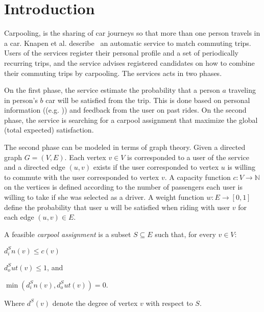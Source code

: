 \section{Introduction}
Carpooling, is the sharing of car journeys so that more than one person travels
in a car.
Knapen et al. describe~\cite{knapen2013estimating} an automatic service
to match commuting trips.
Users of the services register their personal profile and a set of periodically
recurring trips, 
and the service advises registered candidates on how to combine their commuting
trips by carpooling.
The services acts in two phases. 

On the first phase, the service estimate the probability that a person $a$
traveling in person's $b$ car will be satisfied from the trip.
This is done based on personal information ((e.g. )) and feedback from the user on past rides.
On the second phase, the service is searching for a carpool assignment that
maximize the global (total expected) satisfaction.

The second phase can be modeled in terms of graph theory.
Given a directed graph $G = (V, E)$.
Each vertex $v \in V$ is corresponded to a user of the service and a directed
edge $(u, v)$ exists if the user corresponded to vertex $u$ is willing to
commute with the user corresponded to vertex $v$.
A capacity function $ c : V \rightarrow \mathbb{N} $ on the vertices is defined
according to the number of passengers each user is willing to take if she was
selected as a driver.
A weight function $w : E \rightarrow [0, 1] $ define the probability that user
$u$ will be satisfied when riding with user $v$ for each edge $(u, v) \in E$.

A feasible \emph{carpool assignment} is a subset $S \subseteq E$ such
that, for every $v \in V$:
\begin{inparaenum}
\item $ d^S_in(v) \leq c(v) $
\item $ d^S_out(v) \leq 1 $, and
\item $ \min(d^S_in(v), d^S_out(v)) = 0 $.
\end{inparaenum}
Where $d^S(v)$ denote the degree of vertex $v$ with respect to $S$.

